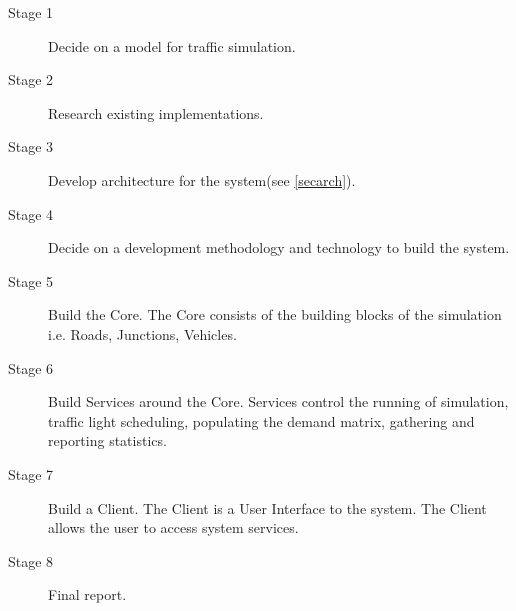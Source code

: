 \documentclass[11pt]{article}
\begin{document}
	\begin{description}
		\item[Stage 1] Decide on a model for traffic simulation.
		\item[Stage 2] Research existing implementations.
		\item[Stage 3] Develop architecture for the system(see \ref{secarch}).
		\item[Stage 4] Decide on a development methodology and technology to build the system.
		\item[Stage 5] Build the Core. The Core consists of the building blocks of the simulation i.e. Roads, Junctions, Vehicles.
		\item[Stage 6] Build Services around the Core. Services control the running of simulation, traffic light scheduling, populating the demand matrix, gathering and reporting statistics.  
		\item[Stage 7] Build a Client. The Client is a User Interface to the system. The Client allows the user to access system services.
		\item[Stage 8] Final report.
		\\
	\end{description}
	
\end{document}
